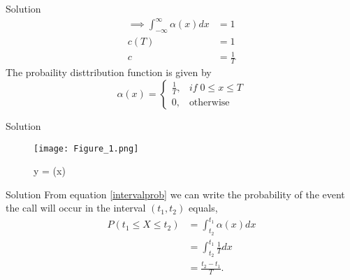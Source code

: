 \documentclass{beamer}
\begin{document}
     \begin{frame}{Solution}
     \begin{align}
         \implies \int_{-\infty}^{\infty} \alpha(x) dx &= 1 \\ \nonumber
          c(T) &= 1 \\ \nonumber
           c &= \frac{1}{T}
     \end{align}
     The probaility disttribution function is given by
         \[ 
    \alpha(x) = 
  \begin{cases}
    \frac{1}{T}, & if \; 0\le x \le T \\
    0, & \text{otherwise}
  \end{cases} 
         \]
     \end{frame}
     
     \begin{frame}{Solution}
         \begin{figure}
             \centering
             \texttt{[image: Figure\_1.png]}
             \caption{y = \alpha(x)}
             \label{fig:my_distribution}
         \end{figure}
     \end{frame}
     
     \begin{frame}{Solution}
     From equation \eqref{intervalprob} we can write the
     probability of the  event {the call} will occur in the
     interval $(t_1,t_2)$ equals,
     \begin{align*}
         P(t_1 \le X \le t_2) &=  \int_{t_2}^{t_1} \alpha(x)dx \\
                      &=  \int_{t_2}^{t_1} \frac{1}{T}dx \\
                      &=   \frac{t_2-t_1}{T}.
     \end{align*}
     \end{frame}
\end{document}
